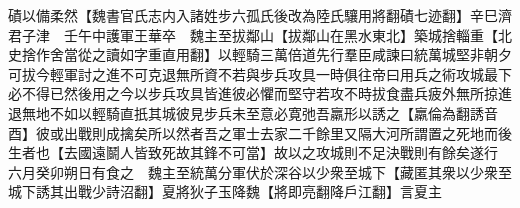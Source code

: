 磧以備柔然【魏書官氏志内入諸姓步六孤氏後改為陸氏驤用將翻磧七迹翻】辛巳濟君子津　壬午中護軍王華卒　魏主至拔鄰山【拔鄰山在黑水東北】築城捨輜重【北史捨作舍當從之讀如字重直用翻】以輕騎三萬倍道先行羣臣咸諫曰統萬城堅非朝夕可拔今輕軍討之進不可克退無所資不若與步兵攻具一時俱往帝曰用兵之術攻城最下必不得已然後用之今以步兵攻具皆進彼必懼而堅守若攻不時拔食盡兵疲外無所掠進退無地不如以輕騎直扺其城彼見步兵未至意必寛弛吾羸形以誘之【羸倫為翻誘音酉】彼或出戰則成擒矣所以然者吾之軍士去家二千餘里又隔大河所謂置之死地而後生者也【去國遠鬬人皆致死故其鋒不可當】故以之攻城則不足決戰則有餘矣遂行　六月癸卯朔日有食之　魏主至統萬分軍伏於深谷以少衆至城下【藏匿其衆以少衆至城下誘其出戰少詩沼翻】夏將狄子玉降魏【將即亮翻降戶江翻】言夏主